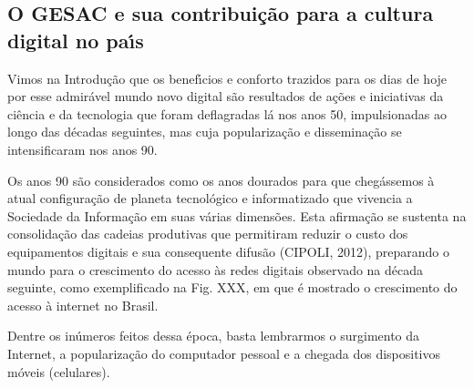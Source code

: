 \documentclass[
12pt,		%
openright,	%
twoside,  %
a4paper,			%
chapter=TITLE,		%
english,			%
french,				%
spanish,			%
brazil				%
]{USPSC-classe/USPSC}
\begin{document}
\subsection[O GESAC e sua contribui\c{c}\~ao para  a cultura  digital  no pa\'{\i}s]{O GESAC e sua contribui\c{c}\~ao para  a cultura  digital  no pa\'{\i}s}\label{O GESAC e sua contribui\c{c}\~ao para  a cultura  digital  no pa\'{\i}s}
Vimos na Introdu\c{c}\~ao que os benef\'{\i}cios e conforto trazidos para os dias de hoje por esse admir\'avel mundo novo digital s\~ao resultados de a\c{c}\~oes e iniciativas da ci\^encia e da tecnologia que foram deflagradas l\'a nos anos 50, impulsionadas ao longo das d\'ecadas seguintes, mas cuja populariza\c{c}\~ao e dissemina\c{c}\~ao se intensificaram nos anos 90.

















Os anos 90 s\~ao considerados como os anos dourados para que cheg\'assemos \`a atual configura\c{c}\~ao de planeta tecnol\'ogico e informatizado que vivencia a Sociedade da Informa\c{c}\~ao em suas v\'arias dimens\~oes. Esta afirma\c{c}\~ao se sustenta na consolida\c{c}\~ao das cadeias produtivas que permitiram reduzir o custo dos equipamentos digitais e sua consequente difus\~ao  (CIPOLI, 2012), preparando o mundo para o crescimento do acesso \`as redes digitais observado na d\'ecada seguinte, como exemplificado na Fig. XXX, em que \'e mostrado o crescimento do acesso \`a internet no Brasil.

















Dentre os  in\'umeros feitos dessa \'epoca, basta lembrarmos o surgimento da Internet, a populariza\c{c}\~ao do computador pessoal e a chegada dos dispositivos m\'oveis (celulares).
\end{document}

